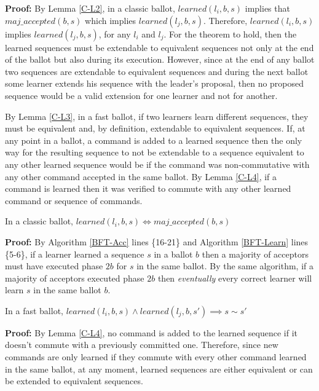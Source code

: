 \textbf{Proof:} By Lemma \ref{C-L2}, in a classic ballot, $learned(l_i,b,s)$ implies that {\allowbreak $maj\_accepted(b,s)$ }which implies $learned(l_j,b,s)$. Therefore, $learned(l_i,b,s)$ implies $learned(l_j,b,s)$, for any $l_i$ and $l_j$. For the theorem to hold, then the learned sequences must be extendable to equivalent sequences not only at the end of the ballot but also during its execution. However, since at the end of any ballot two sequences are extendable to equivalent sequences and during the next ballot some learner extends his sequence with the leader's proposal, then no proposed sequence would be a valid extension for one learner and not for another. \par
By Lemma \ref{C-L3}, in a fast ballot, if two learners learn different sequences, they must be equivalent and, by definition, extendable to equivalent sequences. If, at any point in a ballot, a command is added to a learned sequence then the only way for the resulting sequence to not be extendable to a sequence equivalent to any other learned sequence would be if the command was non-commutative with any other command accepted in the same ballot. By Lemma \ref{C-L4}, if a command is learned then it was verified to commute with any other learned command or sequence of commands. 
\begin{lemma}
In a classic ballot, $learned(l_i,b,s) \Leftrightarrow  maj\_accepted(b,s)$ \label{C-L2} \par
\end{lemma} 

\textbf{Proof:} By Algorithm \ref{BFT-Acc} lines \{16-21\} and Algorithm \ref{BFT-Learn} lines \{5-6\}, if a learner learned a sequence $s$ in a ballot $b$ then a majority of acceptors must have executed phase $2b$ for $s$ in the same ballot. By the same algorithm, if a majority of acceptors executed phase $2b$ then \textit{eventually} every correct learner will learn $s$ in the same ballot $b$.

\begin{lemma}
In a fast ballot, $learned(l_i,b,s) \land learned(l_j,b,s') \implies s \sim s'$ \label{C-L3} \par
\end{lemma}

\textbf{Proof:} By Lemma \ref{C-L4}, no command is added to the learned sequence if it doesn't commute with a previously committed one. Therefore, since new commands are only learned if they commute with every other command learned in the same ballot, at any moment, learned sequences are either equivalent or can be extended to equivalent sequences. 

